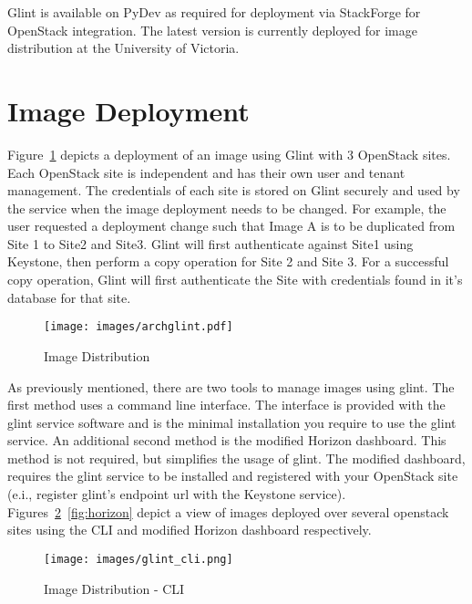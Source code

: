 \documentclass[a4paper]{jpconf}
\begin{document}
Glint is available on PyDev as required for deployment via StackForge for OpenStack integration. The latest version is currently deployed for image distribution at the University of Victoria. 

\section{Image Deployment}
Figure~\ref{fig:glintfigure} depicts a deployment of an image using Glint with 3 OpenStack sites. Each OpenStack site is independent and has their own user and tenant management. The credentials of each site is stored on Glint securely and used by the service when the image deployment needs to be changed. For example, the user requested a deployment change such that Image A is to be duplicated from Site 1 to Site2 and Site3. Glint will first authenticate against Site1 using Keystone, then perform a copy operation for Site 2 and Site 3. For a successful copy operation, Glint will first authenticate the Site with credentials found in it's database for that site.

\begin{figure}[H]
\begin{center}
\texttt{[image: images/archglint.pdf]}
\caption{\label{fig:glintfigure}Image Distribution }
\end{center}
\end{figure}

As previously mentioned, there are two tools to manage images using glint. The first method uses a command line interface. The interface is provided with the glint service software and is the minimal installation you require to use the glint service. An additional second method is the modified Horizon dashboard. This method is not required, but simplifies the usage of glint. The modified dashboard, requires the glint service to be installed and registered with your OpenStack site (e.i., register glint's endpoint url with the Keystone service). Figures~\ref{fig:cli}~\ref{fig:horizon} depict a view of images deployed over several openstack sites using the CLI and modified Horizon dashboard respectively.

\begin{figure}[H]
\begin{center}
\texttt{[image: images/glint\_cli.png]}
\caption{\label{fig:cli}Image Distribution - CLI}
\end{center}
\end{figure}
\end{document}
